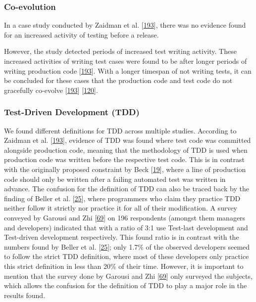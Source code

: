 \documentclass[]{book}
\begin{document}
\subsubsection{Co-evolution}\label{co-evolution}

In a case study conducted by Zaidman et al.
{[}\protect\hyperlink{ref-zaidman2011studying}{193}{]}, there was no
evidence found for an increased activity of testing before a release.

However, the study detected periods of increased test writing activity.
These increased activities of writing test cases were found to be after
longer periods of writing production code
{[}\protect\hyperlink{ref-zaidman2011studying}{193}{]}. With a longer
timespan of not writing tests, it can be concluded for these cases that
the production code and test code do not gracefully co-evolve
{[}\protect\hyperlink{ref-zaidman2011studying}{193}{]}
{[}\protect\hyperlink{ref-marsavina2014}{120}{]}.

\subsubsection{Test-Driven Development
(TDD)}\label{test-driven-development-tdd}

We found different definitions for TDD across multiple studies.
According to Zaidman et al.
{[}\protect\hyperlink{ref-zaidman2011studying}{193}{]}, evidence of TDD
was found where test code was committed alongside production code,
meaning that the methodology of TDD is used when production code was
written before the respective test code. This is in contrast with the
originally proposed constraint by Beck
{[}\protect\hyperlink{ref-beck2003test}{19}{]}, where a line of
production code should only be written after a failing automated test
was written in advance. The confusion for the definition of TDD can also
be traced back by the finding of Beller et al.
{[}\protect\hyperlink{ref-beller2015}{25}{]}, where programmers who
claim they practice TDD neither follow it strictly nor practice it for
all of their modification. A survey conveyed by Garousi and Zhi
{[}\protect\hyperlink{ref-GAROUSI20131354}{69}{]} on 196 respondents
(amongst them managers and developers) indicated that with a ratio of
3:1 use Test-last development and Test-driven development respectively.
This found ratio is in contrast with the numbers found by Beller et al.
{[}\protect\hyperlink{ref-beller2015}{25}{]}; only 1.7\% of the observed
developers seemed to follow the strict TDD definition, where most of
these developers only practice this strict definition in less than 20\%
of their time. However, it is important to mention that the survey done
by Garousi and Zhi {[}\protect\hyperlink{ref-GAROUSI20131354}{69}{]}
only surveyed the subjects, which allows the confusion for the
definition of TDD to play a major role in the results found.
\end{document}
